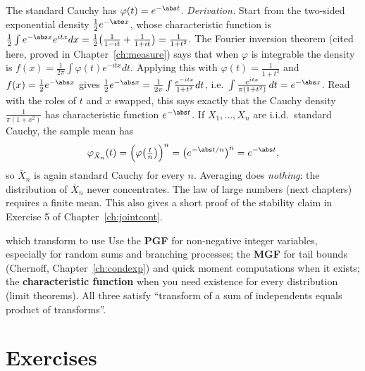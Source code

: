 \begin{example}\label{ex:cauchycf}
The standard Cauchy has $\varphi(t)=e^{-\abs t}$. \emph{Derivation.} Start from the
two-sided exponential density $\tfrac12e^{-\abs x}$, whose characteristic function is
$\tfrac12\int e^{-\abs x}e^{itx}dx=\tfrac12\bigl(\tfrac1{1-it}+\tfrac1{1+it}\bigr)=\tfrac1{1+t^2}$.
The Fourier inversion theorem (cited here, proved in Chapter~\ref{ch:measure}) says that
when $\varphi$ is integrable the density is $f(x)=\frac1{2\pi}\int\varphi(t)e^{-itx}dt$.
Applying this with $\varphi(t)=\frac1{1+t^2}$ and $f(x)=\tfrac12e^{-\abs x}$ gives
$\tfrac12e^{-\abs x}=\frac1{2\pi}\int\frac{e^{-itx}}{1+t^2}dt$, i.e.\
$\int\frac{e^{itx}}{\pi(1+t^2)}\,dt=e^{-\abs x}$. Read with the roles of $t$ and $x$
swapped, this says exactly that the Cauchy density $\frac1{\pi(1+x^2)}$ has
characteristic function $e^{-\abs t}$. If $X_1,\dots,X_n$ are i.i.d.\ standard
Cauchy, the sample mean has
\[
\varphi_{\bar X_n}(t)=\Bigl(\varphi\bigl(\tfrac tn\bigr)\Bigr)^n=\bigl(e^{-\abs t/n}\bigr)^n=e^{-\abs t},
\]
so $\bar X_n$ is again standard Cauchy for every $n$. Averaging does \emph{nothing}:
the distribution of $\bar X_n$ never concentrates. The law of large numbers (next
chapters) requires a finite mean. This also gives a short proof of the stability
claim in Exercise 5 of Chapter~\ref{ch:jointcont}.
\end{example}

\begin{interview}{which transform to use}
Use the \textbf{PGF} for non-negative integer variables, especially for random
sums and branching processes; the \textbf{MGF} for tail bounds (Chernoff,
Chapter~\ref{ch:condexp}) and quick moment computations when it exists; the
\textbf{characteristic function} when you need existence for every distribution
(limit theorems). All three satisfy ``transform of a sum of independents equals
product of transforms''.
\end{interview}

\section*{Exercises}

